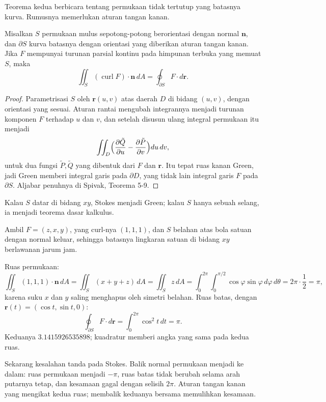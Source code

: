Teorema kedua berbicara tentang permukaan tidak tertutup yang batasnya kurva.
Rumusnya memerlukan aturan tangan kanan.

\begin{teorema}[Stokes]
Misalkan $S$ permukaan mulus sepotong-potong berorientasi dengan normal
$\mathbf{n}$, dan $\partial S$ kurva batasnya dengan orientasi yang diberikan
aturan tangan kanan. Jika $F$ mempunyai turunan parsial kontinu pada himpunan
terbuka yang memuat $S$, maka
\[
\iint_{S}(\operatorname{curl}F)\cdot\mathbf{n}\,dA
=\oint_{\partial S}F\cdot d\mathbf{r}.
\]
\end{teorema}

\begin{proof}
Parametrisasi $S$ oleh $\mathbf{r}(u,v)$ atas daerah $D$ di bidang $(u,v)$,
dengan orientasi yang sesuai. Aturan rantai mengubah integrannya menjadi
turunan komponen $F$ terhadap $u$ dan $v$, dan setelah disusun ulang integral
permukaan itu menjadi
\[
\iint_{D}\Bigl(\frac{\partial \tilde{Q}}{\partial u}
-\frac{\partial \tilde{P}}{\partial v}\Bigr)du\,dv ,
\]
untuk dua fungsi $\tilde{P},\tilde{Q}$ yang dibentuk dari $F$ dan
$\mathbf{r}$. Itu tepat ruas kanan Green, jadi Green memberi integral garis
pada $\partial D$, yang tidak lain integral garis $F$ pada $\partial S$.
Aljabar penuhnya di Spivak, Teorema 5-9.
\end{proof}

Kalau $S$ datar di bidang $xy$, Stokes menjadi Green; kalau $S$ hanya sebuah
selang, ia menjadi teorema dasar kalkulus.

\begin{contoh}
Ambil $F=(z,x,y)$, yang curl-nya $(1,1,1)$, dan $S$ belahan atas bola satuan
dengan normal keluar, sehingga batasnya lingkaran satuan di bidang $xy$
berlawanan jarum jam.

Ruas permukaan:
\[
\iint_{S}(1,1,1)\cdot\mathbf{n}\,dA=\iint_{S}(x+y+z)\,dA=\iint_{S}z\,dA
=\int_{0}^{2\pi}\!\!\int_{0}^{\pi/2}\cos\varphi\sin\varphi\,d\varphi\,d\theta
=2\pi\cdot\frac12=\pi ,
\]
karena suku $x$ dan $y$ saling menghapus oleh simetri belahan. Ruas batas, dengan
$\mathbf{r}(t)=(\cos t,\sin t,0)$:
\[
\oint_{\partial S}F\cdot d\mathbf{r}=\int_{0}^{2\pi}\cos^{2}t\,dt=\pi .
\]
Keduanya $3.1415926535898$; kuadratur memberi angka yang sama pada kedua ruas.
\end{contoh}

Sekarang kesalahan tanda pada Stokes. Balik normal permukaan menjadi ke dalam:
ruas permukaan menjadi $-\pi$, ruas batas tidak berubah selama arah putarnya
tetap, dan kesamaan gagal dengan selisih $2\pi$. Aturan tangan kanan yang
mengikat kedua ruas; membalik keduanya bersama memulihkan kesamaan.

